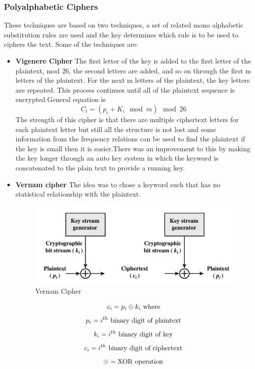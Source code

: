 \documentclass{article}
\begin{document}
\subsubsection{Polyalphabetic Ciphers}
These techniques are based on two techniques, a set of related mono alphabetic substitution rules are used and the key determines which rule is to be used to ciphers the text.
Some of the techniques are:\\
\begin{itemize}
    \item \textbf{Vigenere Cipher}
    The first letter of the key is added to the first letter of the plaintext, mod 26, the second letters are added, and so on through the first m letters of the plaintext. For the next m letters of the plaintext, the key letters are repeated. This process continues until all of the plaintext sequence is encrypted.General equation is
\[
    C_i =(p_i + K_i\mod m)\mod 26
\]
The strength of this cipher is that there are multiple ciphertext letters for each plaintext letter but still all the structure is not lost and some information from the frequency relations can be used to find the plaintext if the key is small then it is easier.There was an improvement to this by making the key longer through an auto key system in which the keyword is concatenated to the plain text to provide a running key.

\item \textbf{Vernam cipher}
The idea was to chose a keyword such that has no statistical relationship with the plaintext.
\\
\begin{figure}
\begin{center}
    
    \includegraphics[scale=0.60]{images/vernam.png}
    \caption{Vernam Cipher}

\end{center}
 \end{figure}

\[ c_i = p_i \oplus k_i\text{ where}\\\]
\[p_i = i^{th} \text{ binary digit of plaintext}\\ \]
\[k_i = i^{th} \text{ binary digit of key}\\\]
\[c_i = i^{th}  \text{ binary digit of ciphertext} \\\]
\[
\oplus = \text{XOR operation}\\
\]  
\end{itemize}   
\end{document}
